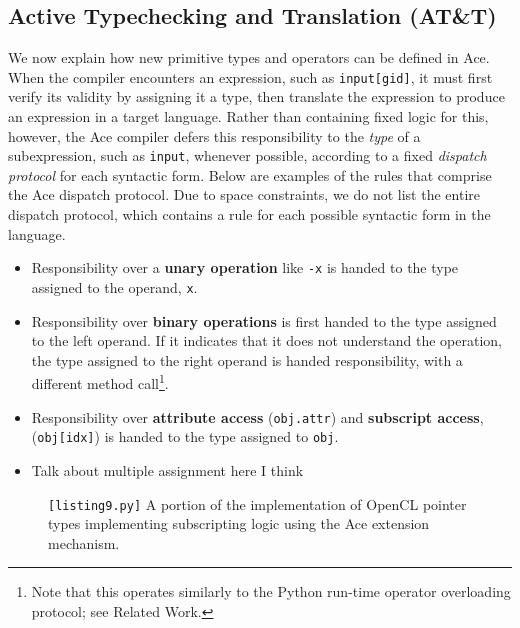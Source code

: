 \documentclass[10pt]{sigplanconf}
\newcommand{\ATT}{AT\&T}
\begin{document}
\subsection{Active Typechecking and Translation (\ATT)}
We now explain how new primitive types and operators can be defined in Ace. When the compiler encounters an expression, such as \verb|input[gid]|, it must first verify its validity by assigning it a type, then translate the expression to produce an expression in a target language. Rather than containing fixed logic for this, however, the Ace compiler defers this responsibility to the {\it type} of a subexpression, such as \verb|input|, whenever possible, according to a fixed {\em dispatch protocol} for each syntactic form. Below are examples of the rules that comprise the Ace dispatch protocol. Due to space constraints, we do not list the entire dispatch protocol, which contains a rule for each possible syntactic form in the language.
\begin{itemize}
\item Responsibility over a {\bf unary operation} like \verb|-x| is handed to the type assigned to the operand, \verb|x|.
\item Responsibility over {\bf binary operations} is first handed to the type assigned to the left operand. If it indicates that it does not understand the operation, the type assigned to the right operand is handed responsibility, with a different method call\footnote{Note that this operates similarly to the Python run-time operator overloading protocol; see Related Work.}.
\item Responsibility over {\bf attribute access} (\texttt{obj.attr}) and {\bf subscript access}, (\texttt{obj[idx]}) is handed to the type assigned to \texttt{obj}.
\item {\color{red} Talk about multiple assignment here I think}
\end{itemize}
\begin{figure}

\caption{\texttt{[listing9.py]} A portion of the implementation of OpenCL pointer types implementing subscripting logic using the Ace extension mechanism.}
\label{pointers}
\end{figure}
\end{document}
